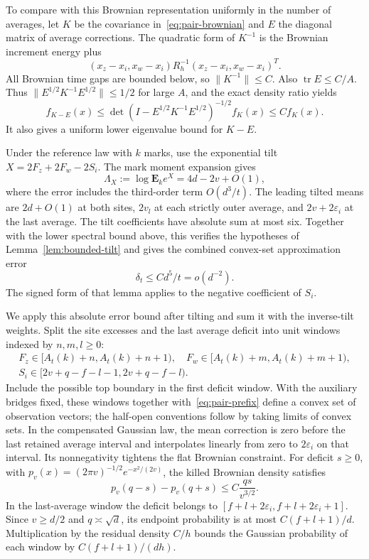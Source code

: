 \documentclass[11pt,letterpaper,reqno]{amsart}
\numberwithin{equation}{section}
\theoremstyle{remark}
\begin{document}
To compare with this Brownian representation uniformly in the number of averages, let $K$ be the covariance in~\eqref{eq:pair-brownian} and $E$ the diagonal matrix of average corrections. The quadratic form of $K^{-1}$ is the Brownian increment energy plus
\[
 (x_z-x_i,x_w-x_i)R_h^{-1}(x_z-x_i,x_w-x_i)^T.
\]
All Brownian time gaps are bounded below, so $\|K^{-1}\|\le C$. Also $\operatorname{tr}E\le C/A$. Thus $\|E^{1/2}K^{-1}E^{1/2}\|\le1/2$ for large $A$, and the exact density ratio yields
\begin{equation}\label{eq:pair-density}
 f_{K-E}(x)\le\det(I-E^{1/2}K^{-1}E^{1/2})^{-1/2}f_K(x)
 \le C f_K(x).
\end{equation}
It also gives a uniform lower eigenvalue bound for $K-E$.

Under the reference law with $k$ marks, use the exponential tilt $X=2F_z+2F_w-2S_i$. The mark moment expansion gives
\begin{equation}\label{eq:9.2}
 \Lambda_X:=\log\mathbf E_ke^X=4d-2v+O(1),
\end{equation}
where the error includes the third-order term $O(d^3/t)$. The leading tilted means are $2d+O(1)$ at both sites, $2v_l$ at each strictly outer average, and $2v+2\varepsilon_i$ at the last average. The tilt coefficients have absolute sum at most six. Together with the lower spectral bound above, this verifies the hypotheses of Lemma~\ref{lem:bounded-tilt} and gives the combined convex-set approximation error
\begin{equation}\label{eq:pair-clt}
 \delta_t\le Cd^5/t=o(d^{-2}).
\end{equation}
The signed form of that lemma applies to the negative coefficient of $S_i$.

We apply this absolute error bound after tilting and sum it with the inverse-tilt weights. Split the site excesses and the last average deficit into unit windows indexed by $n,m,l\ge0$:
\begin{equation}\label{eq:pair-windows}
\begin{gathered}
 F_z\in[A_t(k)+n,A_t(k)+n+1),\quad
 F_w\in[A_t(k)+m,A_t(k)+m+1),\\
 S_i\in[2v+q-f-l-1,2v+q-f-l).
\end{gathered}
\end{equation}
Include the possible top boundary in the first deficit window. With the auxiliary bridges fixed, these windows together with~\eqref{eq:pair-prefix} define a convex set of observation vectors; the half-open conventions follow by taking limits of convex sets. In the compensated Gaussian law, the mean correction is zero before the last retained average interval and interpolates linearly from zero to $2\varepsilon_i$ on that interval. Its nonnegativity tightens the flat Brownian constraint. For deficit $s\ge0$, with $p_v(x)=(2\pi v)^{-1/2}e^{-x^2/(2v)}$, the killed Brownian density satisfies
\[
 p_v(q-s)-p_v(q+s)\le C\frac{qs}{v^{3/2}}.
\]
In the last-average window the deficit belongs to
$[f+l+2\varepsilon_i,f+l+2\varepsilon_i+1]$. Since $v\ge d/2$ and $q\asymp\sqrt d$, its endpoint probability is at most $C(f+l+1)/d$.
Multiplication by the residual density $C/h$ bounds the Gaussian probability of each window by $C(f+l+1)/(dh)$.
\end{document}
